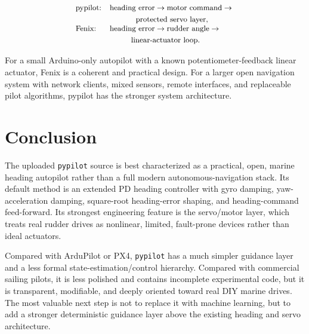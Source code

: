 \documentclass[11pt,twocolumn]{article}
\begin{document}
\[
\small
\begin{array}{ll}
\text{pypilot:} &
\begin{gathered}[t]
\text{heading error}\to\text{motor command}\to{}\\
\text{protected servo layer},
\end{gathered}
\\[6pt]
\text{Fenix:} &
\begin{gathered}[t]
\text{heading error}\to\text{rudder angle}\to{}\\
\text{linear-actuator loop}.
\end{gathered}
\end{array}
\]

For a small Arduino-only autopilot with a known potentiometer-feedback
linear actuator, Fenix is a coherent and practical design.  For a larger
open navigation system with network clients, mixed sensors, remote
interfaces, and replaceable pilot algorithms, pypilot has the stronger
system architecture.

\section{Conclusion}

The uploaded \texttt{pypilot} source is best characterized as a practical, open, marine
heading autopilot rather than a full modern autonomous-navigation stack.  Its default
method is an extended PD heading controller with gyro damping, yaw-acceleration damping,
square-root heading-error shaping, and heading-command feed-forward.  Its strongest
engineering feature is the servo/motor layer, which treats real rudder drives as nonlinear,
limited, fault-prone devices rather than ideal actuators.

Compared with ArduPilot or PX4, \texttt{pypilot} has a much simpler guidance layer and a
less formal state-estimation/control hierarchy.  Compared with commercial sailing pilots,
it is less polished and contains incomplete experimental code, but it is transparent,
modifiable, and deeply oriented toward real DIY marine drives.  The most valuable next step
is not to replace it with machine learning, but to add a stronger deterministic guidance
layer above the existing heading and servo architecture.
\end{document}
